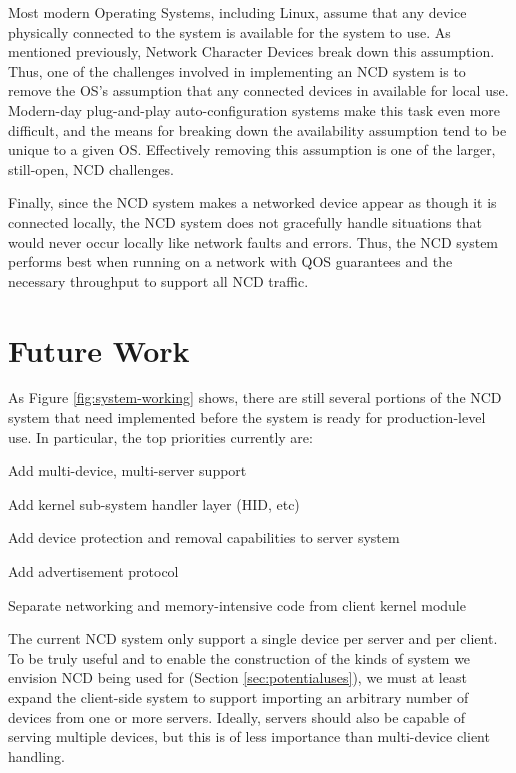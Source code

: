 \documentclass[11pt,twocolumn]{article}
\newenvironment{packed_item}{
\begin{itemize}
  \setlength{\itemsep}{1pt}
  \setlength{\parskip}{0pt}
  \setlength{\parsep}{0pt}
}{\end{itemize}}
\begin{document}
Most modern Operating Systems, including Linux, assume that any device
physically connected to the system is available for the system to
use. As mentioned previously, Network Character Devices break down this
assumption. Thus, one of the challenges involved in implementing an NCD
system is to remove the OS's assumption that any connected devices in
available for local use. Modern-day plug-and-play auto-configuration
systems make this task even more difficult, and the means for breaking
down the availability assumption tend to be unique to a given
OS. Effectively removing this assumption is one of the larger,
still-open, NCD challenges.

Finally, since the NCD system makes a networked device appear as
though it is connected locally, the NCD system does not gracefully
handle situations that would never occur locally like network faults
and errors. Thus, the NCD system performs best when running on a
network with QOS guarantees and the necessary throughput to support all
NCD traffic.

\section{Future Work}
\label{sec:futurework}

As Figure \ref{fig:system-working} shows, there are still several
portions of the NCD system that need implemented before the system is
ready for production-level use. In particular, the top priorities
currently are:

\begin{packed_item}
\item Add multi-device, multi-server support
\item Add kernel sub-system handler layer (HID, etc)
\item Add device protection and removal capabilities to server system
\item Add advertisement protocol
\item Separate networking and memory-intensive code from client kernel module
\end{packed_item}

The current NCD system only support a single device per server and per
client. To be truly useful and to enable the construction of the
kinds of system we envision NCD being used for (Section
\ref{sec:potentialuses}), we must at least
expand the client-side
system to support importing an arbitrary number of devices from one
or more servers. Ideally, servers should also be capable of serving
multiple devices, but this is of less importance than multi-device
client handling.
\end{document}
